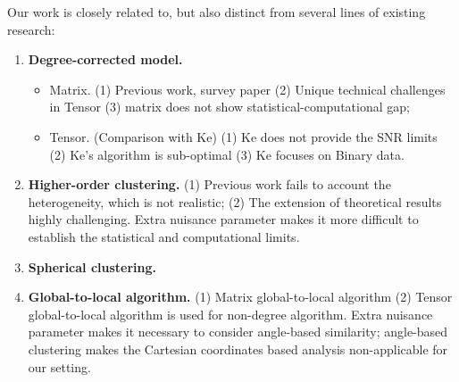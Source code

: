 \documentclass[lettersize,journal]{IEEEtran}
\theoremstyle{definition}
\theoremstyle{definition}
\begin{document}
{
\color{red}

Our work is closely related to, but also distinct from several lines of existing research:
\begin{enumerate}

\item \textbf{Degree-corrected model.}
    \begin{itemize}
        \item Matrix. (1) Previous work, survey paper (2) Unique technical challenges in Tensor (3) matrix does not show statistical-computational gap;
        \item Tensor. (Comparison with Ke) (1) Ke does not provide the SNR limits (2) Ke's algorithm is sub-optimal (3) Ke focuses on Binary data. 
    \end{itemize}

    \item \textbf{Higher-order clustering.} (1) Previous work fails to account the heterogeneity, which is not realistic; (2) The extension of theoretical results highly challenging.  Extra nuisance parameter makes it more difficult to establish the statistical and computational limits. 
    
    \item \textbf{Spherical clustering.} 
    
    \item \textbf{Global-to-local algorithm.} (1) Matrix global-to-local algorithm (2) Tensor global-to-local algorithm is used for non-degree algorithm. Extra nuisance parameter makes it necessary to consider angle-based similarity; angle-based clustering makes the Cartesian coordinates based analysis non-applicable for our setting. 
\end{enumerate}



}


\begin{table}[t]
    \caption{Comparison between previous methods with our method. $^*$We list here only the result for order-2 tensors (i.e., matrix). Our results allow general tensors of arbitrary order $K$; See Theorem~\ref{thm:refinement}.}\label{tab:comp}
\end{table}
\end{document}
